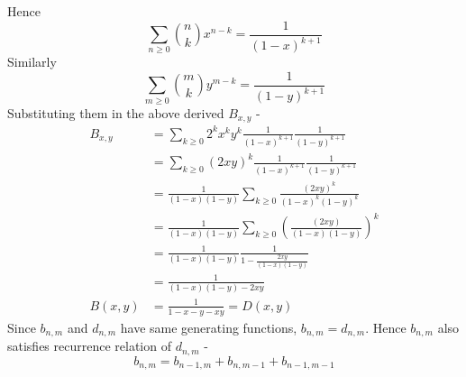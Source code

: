 Hence
$$ \sum_{n \geq 0} {n \choose k} x^{n-k} = \frac{1}{(1-x)^{k+1}} $$
Similarly 
$$ \sum_{m \geq 0} {m \choose k} y^{m-k} = \frac{1}{(1-y)^{k+1}} $$
Substituting them in the above derived $B_{x, y}$ - 
\begin{align*}
    B_{x, y} &= \sum_{k \geq 0} 2^k x^k y^k \frac{1}{(1-x)^{k+1}} \frac{1}{(1-y)^{k+1}} \\
    &= \sum_{k \geq 0} (2xy)^k \frac{1}{(1-x)^{k+1}} \frac{1}{(1-y)^{k+1}} \\
    &= \frac{1}{(1-x)(1-y)} \sum_{k \geq 0} \frac{(2xy)^k}{(1-x)^k(1-y)^k} \\
    &= \frac{1}{(1-x)(1-y)} \sum_{k \geq 0} (\frac{(2xy)}{(1-x)(1-y)}) ^k \\
    &= \frac{1}{(1-x)(1-y)} \frac{1}{1- \frac{2xy}{(1-x)(1-y)}} \\
    &= \frac{1}{(1-x)(1-y) - 2xy} \\
    B(x, y) &=  \frac{1}{1 - x - y - xy} = D(x, y)
\end{align*}
Since $b_{n, m}$ and $d_{n, m}$ have same generating functions, $b_{n, m} = d_{n, m}$. Hence $b_{n, m}$ also satisfies recurrence relation of $d_{n, m}$ - 
$$ b_{n, m} = b_{n-1, m} + b_{n, m-1} + b_{n-1, m-1}$$


